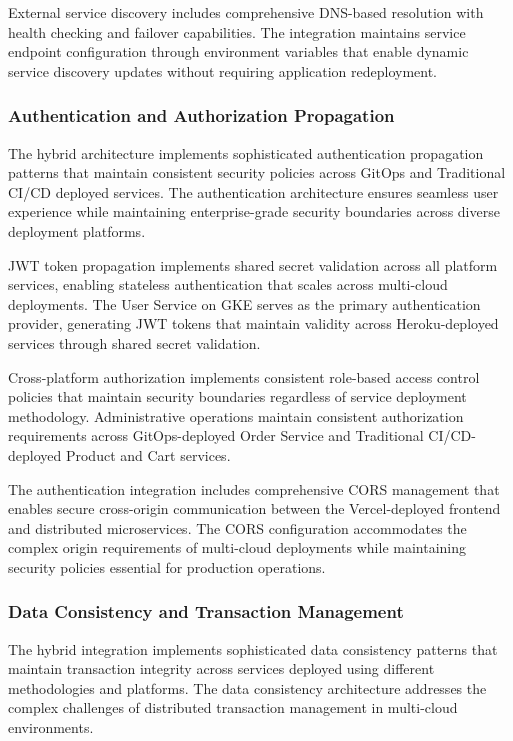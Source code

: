 External service discovery includes comprehensive DNS-based resolution with health checking and failover capabilities. The integration maintains service endpoint configuration through environment variables that enable dynamic service discovery updates without requiring application redeployment.

\subsubsection{Authentication and Authorization Propagation}

The hybrid architecture implements sophisticated authentication propagation patterns that maintain consistent security policies across GitOps and Traditional CI/CD deployed services. The authentication architecture ensures seamless user experience while maintaining enterprise-grade security boundaries across diverse deployment platforms.

JWT token propagation implements shared secret validation across all platform services, enabling stateless authentication that scales across multi-cloud deployments. The User Service on GKE serves as the primary authentication provider, generating JWT tokens that maintain validity across Heroku-deployed services through shared secret validation.

Cross-platform authorization implements consistent role-based access control policies that maintain security boundaries regardless of service deployment methodology. Administrative operations maintain consistent authorization requirements across GitOps-deployed Order Service and Traditional CI/CD-deployed Product and Cart services.

The authentication integration includes comprehensive CORS management that enables secure cross-origin communication between the Vercel-deployed frontend and distributed microservices. The CORS configuration accommodates the complex origin requirements of multi-cloud deployments while maintaining security policies essential for production operations.

\subsubsection{Data Consistency and Transaction Management}

The hybrid integration implements sophisticated data consistency patterns that maintain transaction integrity across services deployed using different methodologies and platforms. The data consistency architecture addresses the complex challenges of distributed transaction management in multi-cloud environments.

